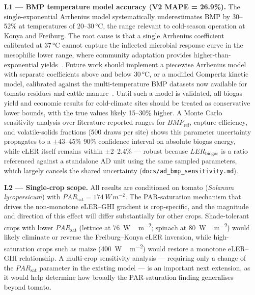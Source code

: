 \textbf{L1 --- BMP temperature model accuracy (V2 MAPE = 26.9\%).}
The single-exponential Arrhenius model systematically underestimates
BMP by 30--52\% at temperatures of 20--30\,\si{\celsius}, the range
relevant to cold-season operation at Konya and Freiburg. The root
cause is that a single Arrhenius coefficient calibrated at
37\,\si{\celsius} cannot capture the inflected microbial response
curve in the mesophilic lower range, where community adaptation
provides higher-than-exponential yields~\citep{zwietering1990}.
Future work should implement a piecewise Arrhenius model with
separate coefficients above and below 30\,\si{\celsius}, or a
modified Gompertz kinetic model, calibrated against the
multi-temperature BMP datasets now available for
tomato residues and cattle manure~\citep{feng2013, pilarski2025}.
Until such a model is validated, all biogas yield and economic
results for cold-climate sites should be treated as conservative
lower bounds, with the true values likely 15--30\% higher. A Monte
Carlo sensitivity analysis over literature-reported ranges for
$BMP_{\text{ref}}$, capture efficiency, and volatile-solids
fractions (500 draws per site) shows this parameter uncertainty
propagates to a $\pm$43--45\% 90\% confidence interval on absolute
biogas energy, while eLER itself remains within $\pm$2--2.4\% ---
robust because $LER_{\text{biogas}}$ is a ratio referenced against a
standalone AD unit using the same sampled parameters, which largely
cancels the shared uncertainty (\texttt{docs/ad\_bmp\_sensitivity.md}).

\textbf{L2 --- Single-crop scope.}
All results are conditioned on tomato (\textit{Solanum lycopersicum})
with $PAR_{\text{sat}} = \SI{174}{W\,m^{-2}}$. The PAR-saturation
mechanism that drives the non-monotone eLER--GHI gradient is
crop-specific, and the magnitude and direction of this effect will
differ substantially for other crops. Shade-tolerant crops with
lower $PAR_{\text{sat}}$ (lettuce at \SI{76}{W\,m^{-2}}; spinach
at \SI{80}{W\,m^{-2}}) would likely eliminate or reverse the
Freiburg--Konya eLER inversion, while high-saturation crops such
as maize (\SI{400}{W\,m^{-2}}) would restore a monotone eLER--GHI
relationship. A multi-crop sensitivity analysis --- requiring only a change of
the $PAR_{\text{sat}}$ parameter in the existing model --- is an
important next extension, as it would help determine how broadly
the PAR-saturation finding generalises beyond tomato.

